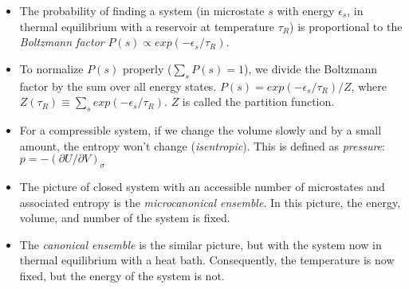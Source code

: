 \begin{itemize}
\item The probability of finding a system (in microstate $s$ with
	energy $\epsilon_s$, in thermal equilibrium with a reservoir 
	at temperature $\tau_R$) is proportional to the 
	\emph{Boltzmann factor} $P(s) \propto exp(-\epsilon_s/\tau_R)$.

\item To normalize $P(s)$ properly ($\sum_{s} P(s) = 1$), we divide
	the Boltzmann factor by the sum over all energy states.
	$P(s) = exp(-\epsilon_s/\tau_R)/Z$, where 
	$Z(\tau_R) \equiv \sum_{s} exp(-\epsilon_s/\tau_R)$. $Z$ is called the
	partition function.

\item For a compressible system, if we change the volume slowly and by
	a small amount, the entropy won't change (\textit{isentropic}). This
	is defined as \textit{pressure}: $p = -(\partial U/\partial V)_\sigma$

\item The picture of closed system with an accessible number of microstates
	and associated entropy is the \emph{microcanonical ensemble}. In this picture, the energy, volume, and number of the system is fixed.

\item The \emph{canonical ensemble} is the similar picture, but with 
	the system now in thermal equilibrium with a heat bath. Consequently,
	the temperature is now fixed, but the energy of the system is not.

\end{itemize}




